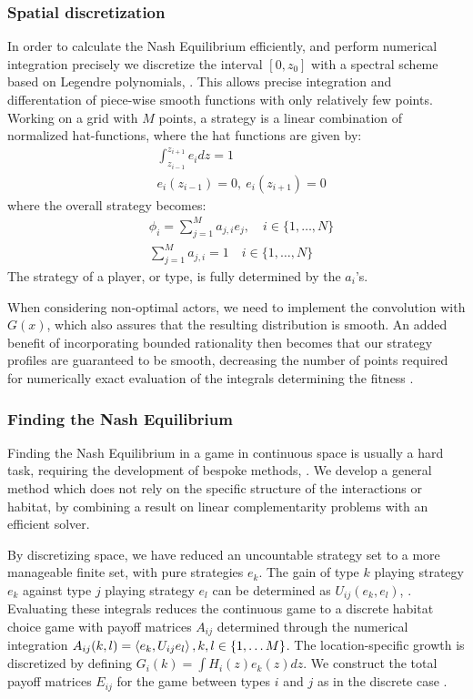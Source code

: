 \subsubsection{Spatial discretization}
In order to calculate the Nash Equilibrium efficiently, and perform numerical integration precisely we discretize the interval $[0,z_0]$ with a spectral scheme based on Legendre polynomials, \citep{kopriva2009implementing}. This allows precise integration and differentation of piece-wise smooth functions with only relatively few points. Working on a grid with $M$ points, a strategy is a linear combination of normalized hat-functions, where the hat functions are given by:
\begin{align*}
	& \int_{z_{i-1}}^{z_{i+1}} e_i dz = 1 \\
	&e_i(z_{i-1}) = 0,~ e_i(z_{i+1}) = 0
\end{align*}
where the overall strategy becomes:
\begin{align*}
  &\phi_{i} = \sum_{j=1}^M a_{j,i} e_j, \quad i\in \{1,\dots, N\} \\
  &\sum_{j=1}^M a_{j,i} = 1 \quad i\in \{1,\dots, N\}
\end{align*}
The strategy of a player, or type, is fully determined by the $a_i$'s.


When considering non-optimal actors, we need to implement the convolution with $G(x)$, which also assures that the resulting distribution is smooth. An added benefit of incorporating bounded rationality then becomes that our strategy profiles are guaranteed to be smooth, decreasing the number of points required for numerically exact evaluation of the integrals determining the fitness .


\subsubsection{Finding the Nash Equilibrium}
Finding the Nash Equilibrium in a game in continuous space is usually a hard task, requiring the development of bespoke methods, \citep{verticalmigration, jerome}. We develop a general method which does not rely on the specific structure of the interactions or habitat, by combining a result on linear complementarity problems \citep{miller1991copositive} with an efficient solver.

By discretizing space, we have reduced an uncountable strategy set to a more manageable finite set, with pure strategies $e_k$. The gain of type $k$ playing strategy $e_k$ against type $j$ playing strategy $e_l$ can be determined as $U_{ij}(e_k,e_l)$, . Evaluating these integrals reduces the continuous game to a discrete habitat choice game  with payoff matrices $A_{ij}$ determined through the numerical integration $A_{ij}(k,l)=\left \langle e_k,U_{ij}e_l \right \rangle, k,l \in \{1,\dots M\}$. The location-specific growth is discretized by defining $G_i(k) = \int H_i(z) e_k(z) dz$. We construct the total payoff matrices $E_{ij}$ for the game between types $i$ and $j$ as in the discrete case .

